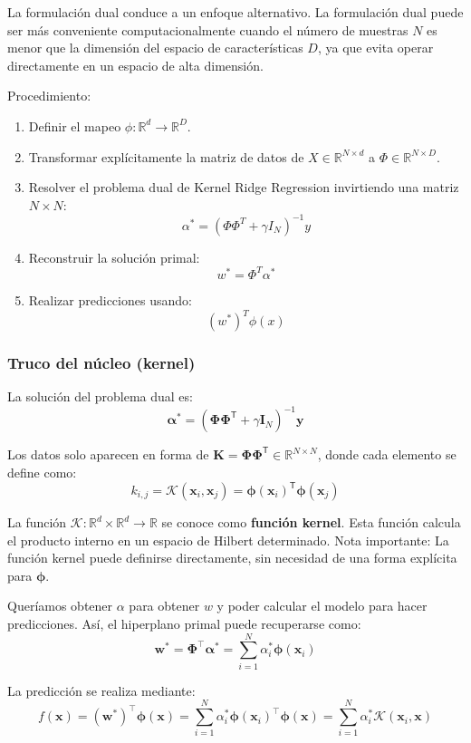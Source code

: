 La formulación dual conduce a un enfoque alternativo. La formulación dual puede ser más conveniente computacionalmente cuando el número de muestras $N$ es menor que la dimensión del espacio de características $D$, ya que evita operar directamente en un espacio de alta dimensión.

Procedimiento:
\begin{enumerate}
\item Definir el mapeo $\phi : \mathbb{R}^d \to \mathbb{R}^D$.
\item Transformar explícitamente la matriz de datos de $X \in \mathbb{R}^{N \times d}$ a $\Phi \in \mathbb{R}^{N \times D}$.
\item Resolver el problema dual de Kernel Ridge Regression invirtiendo una matriz $N \times N$:
$$ \alpha^* = (\Phi \Phi^T + \gamma I_N)^{-1} y $$
\item Reconstruir la solución primal:
$$ w^* = \Phi^T \alpha^* $$
\item Realizar predicciones usando:
$$ (w^*)^T \phi(x) $$
\end{enumerate}

\subsubsection{Truco del núcleo (kernel)}
La solución del problema dual es:
$$\boldsymbol{\alpha}^{*} = \left(\boldsymbol{\Phi}\boldsymbol{\Phi}^{\mathsf{T}} + \gamma\mathbf{I}_{N}\right)^{-1}\mathbf{y}$$

Los datos solo aparecen en forma de $\mathbf{K} = \boldsymbol{\Phi}\boldsymbol{\Phi}^{\mathsf{T}} \in \mathbb{R}^{N \times N}$, donde cada elemento se define como:
$$k_{i,j} = \mathcal{K}(\mathbf{x}_{i}, \mathbf{x}_{j}) = \boldsymbol{\phi}(\mathbf{x}_i)^{\mathsf{T}}\boldsymbol{\phi}(\mathbf{x}_j)$$

La función $\mathcal{K}: \mathbb{R}^{d} \times \mathbb{R}^{d} \rightarrow \mathbb{R}$ se conoce como \textbf{función kernel}.
Esta función calcula el producto interno en un espacio de Hilbert determinado.
Nota importante: La función kernel puede definirse directamente, sin necesidad de una forma explícita para $\boldsymbol{\phi}$.

Queríamos obtener $\alpha$ para obtener $w$ y poder calcular el modelo para hacer predicciones. Así, el hiperplano primal puede recuperarse como:
$$\mathbf{w}^* = \boldsymbol{\Phi}^\top \boldsymbol{\alpha}^* = \sum_{i=1}^N \alpha_i^* \boldsymbol{\phi}(\mathbf{x}_i)$$

La predicción se realiza mediante:
$$f(\mathbf{x}) = (\mathbf{w}^*)^\top \boldsymbol{\phi}(\mathbf{x}) = \sum_{i=1}^N \alpha_i^* \boldsymbol{\phi}(\mathbf{x}_i)^\top \boldsymbol{\phi}(\mathbf{x}) = \sum_{i=1}^N \alpha_i^* \mathcal{K}(\mathbf{x}_i, \mathbf{x})$$

